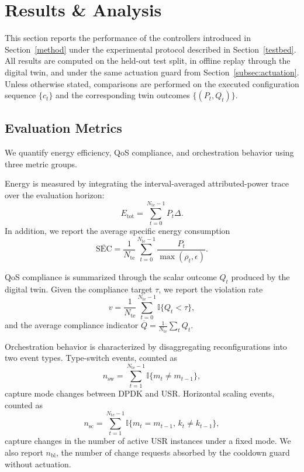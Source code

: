 \documentclass[a4paper,fleqn]{cas-sc}
\begin{document}
\section{Results \& Analysis}
\label{result}

This section reports the performance of the controllers introduced in Section~\ref{method} under the experimental protocol described in Section~\ref{testbed}. All results are computed on the held-out test split, in offline replay through the digital twin, and under the same actuation guard from Section~\ref{subsec:actuation}. Unless otherwise stated, comparisons are performed on the executed configuration sequence $\{c_t\}$ and the corresponding twin outcomes $\{(P_t,Q_t)\}$.

\subsection{Evaluation Metrics}
\label{subsec:metrics}

We quantify energy efficiency, QoS compliance, and orchestration behavior using three metric groups.

Energy is measured by integrating the interval-averaged attributed-power trace over the evaluation horizon:
\begin{equation}
E_{\mathrm{tot}}=\sum_{t=0}^{N_{\mathrm{te}}-1} P_t \Delta.
\label{eq:total_energy}
\end{equation}
In addition, we report the average specific energy consumption
\begin{equation}
\overline{\mathrm{SEC}}=\frac{1}{N_{\mathrm{te}}}\sum_{t=0}^{N_{\mathrm{te}}-1}\frac{P_t}{\max(\rho_t,\epsilon)}.
\label{eq:avg_sec}
\end{equation}

QoS compliance is summarized through the scalar outcome $Q_t$ produced by the digital twin. Given the compliance target $\tau$, we report the violation rate
\begin{equation}
v=\frac{1}{N_{\mathrm{te}}}\sum_{t=0}^{N_{\mathrm{te}}-1}\mathbb{I}\{Q_t<\tau\},
\label{eq:violation_rate}
\end{equation}
and the average compliance indicator $\overline{Q}=\frac{1}{N_{\mathrm{te}}}\sum_t Q_t$.

Orchestration behavior is characterized by disaggregating reconfigurations into two event types. Type-switch events, counted as
\begin{equation}
n_{\mathrm{sw}}=\sum_{t=1}^{N_{\mathrm{te}}-1}\mathbb{I}\{m_t\neq m_{t-1}\},
\label{eq:nsw}
\end{equation}
capture mode changes between DPDK and USR. Horizontal scaling events, counted as
\begin{equation}
n_{\mathrm{sc}}=\sum_{t=1}^{N_{\mathrm{te}}-1}\mathbb{I}\{m_t= m_{t-1},\, k_t\neq k_{t-1}\},
\label{eq:nsc}
\end{equation}
capture changes in the number of active USR instances under a fixed mode. We also report $n_{\mathrm{bl}}$, the number of change requests absorbed by the cooldown guard without actuation.
\end{document}
